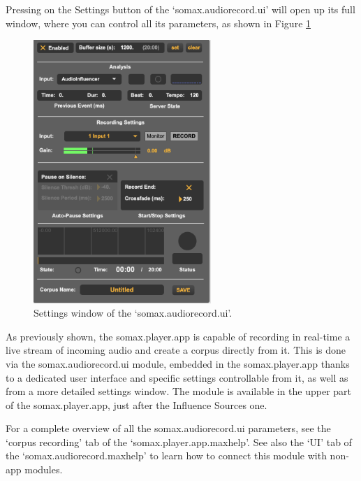 Pressing on the Settings button of the `somax.audiorecord.ui' will open up its full window, where you can control all its parameters, as shown in Figure \ref{fig:audiorecord_window}

\begin{figure}[H]
    \centering        
 	\includegraphics[width=0.6\textwidth]{somax2-6-user-guide/img/audiorecord_window.png}
    \caption{Settings window of the `somax.audiorecord.ui'.}
    \label{fig:audiorecord_window}
\end{figure}

As previously shown, the somax.player.app is capable of recording in real-time a live stream of incoming audio and create a corpus directly from it.
This is done via the somax.audiorecord.ui module, embedded in the somax.player.app thanks to a dedicated user interface and specific settings controllable from it, as well as from a more detailed settings window. The module is available in the upper part of the somax.player.app, just after the Influence Sources one.

For a complete overview of all the somax.audiorecord.ui parameters, see the `corpus recording' tab of the `somax.player.app.maxhelp'. See also the `UI' tab of the `somax.audiorecord.maxhelp' to learn how to connect this module with non-app modules.

